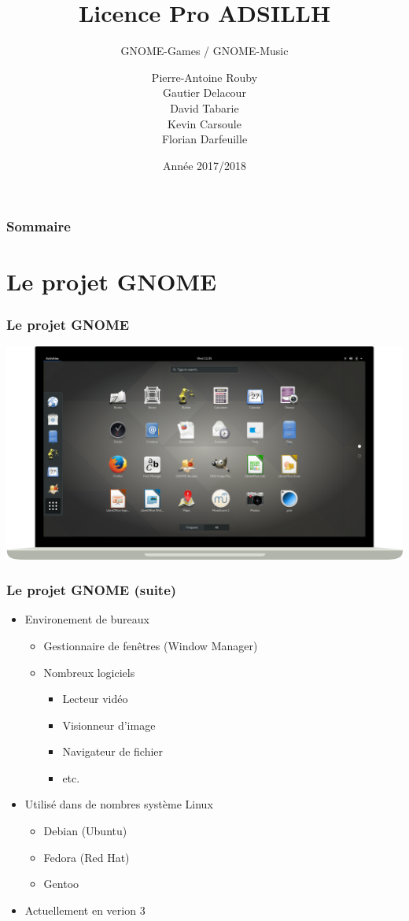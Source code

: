 \documentclass{beamer}
\title{Licence Pro ADSILLH}
\subtitle{GNOME-Games / GNOME-Music}
\author{Pierre-Antoine Rouby\\Gautier Delacour\\
  David Tabarie\\Kevin Carsoule\\Florian Darfeuille}
\date{Année 2017/2018}
\begin{document}
\frame{\titlepage}

\begin{frame}
  \frametitle{Sommaire}
  \tableofcontents
\end{frame}

\section{Le projet GNOME}
\begin{frame}
  \frametitle{Le projet GNOME}
  \includegraphics[scale=0.2]{images/GnomeScreen.png}
\end{frame}

\begin{frame}
  \frametitle{Le projet GNOME (suite)}
  \begin{itemize}
  \item Environement de bureaux \pause
    \begin{itemize}
    \item Gestionnaire de fenêtres (Window Manager) \pause
    \item Nombreux logiciels \pause
      \begin{itemize} %
      \item Lecteur vidéo
      \item Visionneur d'image
      \item Navigateur de fichier
      \item etc. \pause
      \end{itemize}
    \end{itemize}
  \item Utilisé dans de nombres système Linux \pause
    \begin{itemize}
    \item Debian (Ubuntu)
    \item Fedora (Red Hat)
    \item Gentoo \pause
    \end{itemize}
  \item Actuellement en verion 3
  \end{itemize}
\end{frame}
\end{document}
